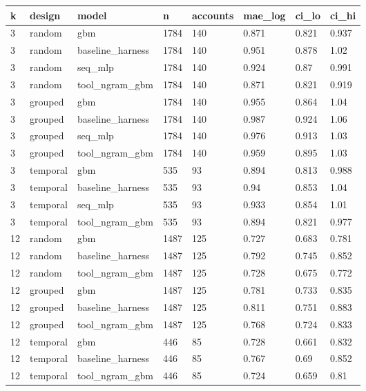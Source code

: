 \begin{tabular}{llllllll}
\toprule
k & design & model & n & accounts & mae\_log & ci\_lo & ci\_hi \\
\midrule
3 & random & gbm & 1784 & 140 & 0.871 & 0.821 & 0.937 \\
3 & random & baseline\_harness & 1784 & 140 & 0.951 & 0.878 & 1.02 \\
3 & random & seq\_mlp & 1784 & 140 & 0.924 & 0.87 & 0.991 \\
3 & random & tool\_ngram\_gbm & 1784 & 140 & 0.871 & 0.821 & 0.919 \\
3 & grouped & gbm & 1784 & 140 & 0.955 & 0.864 & 1.04 \\
3 & grouped & baseline\_harness & 1784 & 140 & 0.987 & 0.924 & 1.06 \\
3 & grouped & seq\_mlp & 1784 & 140 & 0.976 & 0.913 & 1.03 \\
3 & grouped & tool\_ngram\_gbm & 1784 & 140 & 0.959 & 0.895 & 1.03 \\
3 & temporal & gbm & 535 & 93 & 0.894 & 0.813 & 0.988 \\
3 & temporal & baseline\_harness & 535 & 93 & 0.94 & 0.853 & 1.04 \\
3 & temporal & seq\_mlp & 535 & 93 & 0.933 & 0.854 & 1.01 \\
3 & temporal & tool\_ngram\_gbm & 535 & 93 & 0.894 & 0.821 & 0.977 \\
12 & random & gbm & 1487 & 125 & 0.727 & 0.683 & 0.781 \\
12 & random & baseline\_harness & 1487 & 125 & 0.792 & 0.745 & 0.852 \\
12 & random & tool\_ngram\_gbm & 1487 & 125 & 0.728 & 0.675 & 0.772 \\
12 & grouped & gbm & 1487 & 125 & 0.781 & 0.733 & 0.835 \\
12 & grouped & baseline\_harness & 1487 & 125 & 0.811 & 0.751 & 0.883 \\
12 & grouped & tool\_ngram\_gbm & 1487 & 125 & 0.768 & 0.724 & 0.833 \\
12 & temporal & gbm & 446 & 85 & 0.728 & 0.661 & 0.832 \\
12 & temporal & baseline\_harness & 446 & 85 & 0.767 & 0.69 & 0.852 \\
12 & temporal & tool\_ngram\_gbm & 446 & 85 & 0.724 & 0.659 & 0.81 \\
\bottomrule
\end{tabular}
